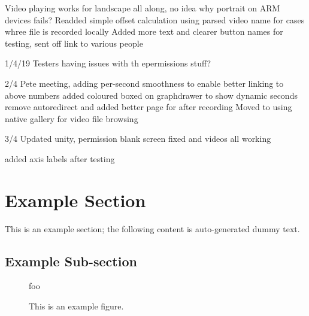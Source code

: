  Video playing works for landscape all along, no idea why portrait on ARM devices fails?
Readded simple offset calculation using parsed video name for cases whree file is recorded locally
Added more text and clearer button names for testing, sent off link to various people



1/4/19
Testers having issues with th epermissions stuff?




2/4 
Pete meeting, adding per-second smoothness to enable better linking to above numbers
added coloured boxed on graphdrawer to show dynamic seconds
remove autoredirect and added better page for after recording
Moved to using native gallery for video file browsing

3/4
Updated unity, permission blank screen fixed and videos all working



added axis labels after testing








































\section{Example Section}

This is an example section;
the following content is auto-generated dummy text.

\subsection{Example Sub-section}

\begin{figure}[t]
\centering
foo
\caption{This is an example figure.}
\label{fig}
\end{figure}

